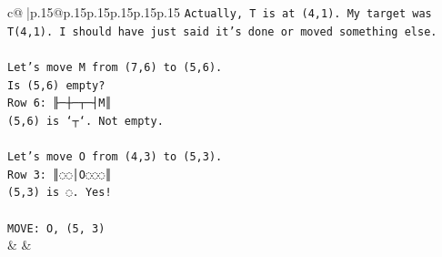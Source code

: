 \documentclass{article}
\begin{document}
{\begin{supertabular}{c@{$\;$}|p{.15\linewidth}@{}p{.15\linewidth}p{.15\linewidth}p{.15\linewidth}p{.15\linewidth}p{.15\linewidth}}
{{{\texttt{Actually, T is at (4,1). My target was T(4,1). I should have just said it's done or moved something else.} \\
\\ 
\texttt{Let's move M from (7,6) to (5,6).} \\
\texttt{Is (5,6) empty?} \\
\texttt{Row 6: ╟─┼─┬─┤M║} \\
\texttt{(5,6) is `┬`. Not empty.} \\
\\ 
\texttt{Let's move O from (4,3) to (5,3).} \\
\texttt{Row 3: ║◌◌│O◌◌◌║} \\
\texttt{(5,3) is ◌. Yes!} \\
\\ 
\texttt{MOVE: O, (5, 3)} \\
            }
        }
    }
    & & \\ \\


\end{supertabular}}
\end{document}
